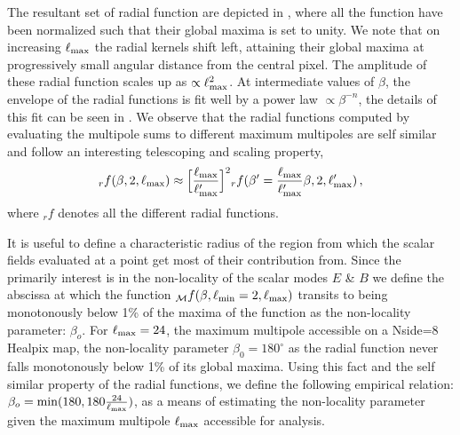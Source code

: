 The resultant set of radial function are depicted in , where all the function have been normalized such that their global maxima is set to unity. We note that on increasing $\ell_{\rm max}$ the radial kernels shift left, attaining their global maxima at progressively small angular distance from the central pixel. The amplitude of these radial function scales up as $\propto \ell_{\rm max}^2$. At intermediate values of $\beta$, the envelope of the radial functions is fit well by a power law $ \propto \beta^{-n}$, the details of this fit can be seen in .
We observe that the radial functions computed by evaluating the multipole sums to different maximum multipoles are self similar and follow an interesting telescoping and scaling property, $${}_rf(\beta,2,\ell_{\rm max}) \approx \Big[\frac{\ell_{\rm max}}{\ell'_{\rm max}}\Big]^2{}_rf(\beta'=\frac{\ell_{\rm max}}{\ell'_{\rm max}} \beta ,2,\ell'_{\rm max}) \,,$$ where ${}_rf$ denotes all the different radial functions. 

It is useful to define a characteristic radius of the region from which the scalar fields evaluated at a point get most of their contribution from.  Since the primarily interest is in the non-locality of the scalar modes $E$ \& $B$ we define the abscissa at which the function ${_{\mathcal{M}}f}(\beta,\ell_{\rm min}=2,\ell_{\rm max})$ transits to being monotonously below 1\% of the maxima of the function as the non-locality parameter: $\beta_{o}$.  For $\ell_{\rm max}=24$, the maximum multipole accessible on a Nside=8 Healpix map, the non-locality parameter $\beta_0=180^{\circ}$ as the radial function never falls monotonously below 1\% of its global maxima. Using this fact and the self similar property of the radial functions, we define the following empirical relation: $\beta_o= {\rm min}(180,180 \frac{24}{\ell_{\rm max}})$, as a means of estimating the non-locality parameter given the maximum multipole $\ell_{\rm max}$ accessible for analysis.